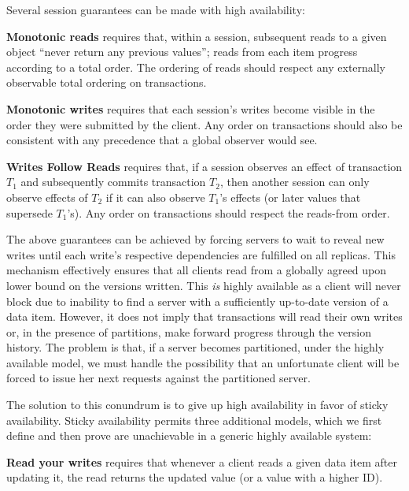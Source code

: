 Several session guarantees can be made with high availability:

\vspace{.5em}\noindent\textbf{{Monotonic reads}} requires that, within
a session, subsequent reads to a given object ``never return any
previous values''; reads from each item progress according to a total
order. The ordering of reads should respect any externally observable
total ordering on transactions.

\vspace{.5em}\noindent\textbf{{Monotonic writes}} requires that each
session's writes become visible in the order they were submitted by
the client. Any order on transactions should also be consistent with
any precedence that a global observer would see.

\vspace{.5em}\noindent\textbf{{Writes Follow Reads}} requires that, if
a session observes an effect of transaction $T_1$ and subsequently
commits transaction $T_2$, then another session can only observe
effects of $T_2$ if it can also observe $T_1$'s effects (or later
values that supersede $T_1$'s).  Any order on transactions should
respect the reads-from order.\vspace{.5em}

The above guarantees can be achieved by forcing servers to wait to
reveal new writes until each write's respective dependencies are
fulfilled on all replicas. This mechanism effectively ensures that all
clients read from a globally agreed upon lower bound on the versions
written. This \textit{is} highly available as a client
will never block due to inability to find a server with a sufficiently
up-to-date version of a data item. However, it does not imply that
transactions will read their own writes or, in the presence of
partitions, make forward progress through the version history. The
problem is that, if a server becomes partitioned, under the highly
available model, we must handle the possibility that an unfortunate
client will be forced to issue her next requests against the
partitioned server.

The solution to this conundrum is to give up high availability in
favor of sticky availability. Sticky availability permits three
additional models, which we first define and then prove are
unachievable in a generic highly available system:

\vspace{.5em}\noindent\textbf{{Read your writes}} requires
that whenever a client reads a given data item after updating it, the
read returns the updated value (or a value with a higher ID).

